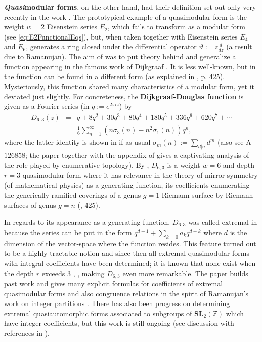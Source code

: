 \documentclass[11pt]{article}
\begin{document}
\textbf{\emph{Quasi}modular forms}, on the other hand, had their definition set out only very recently in the work \cite{kanekoZagier1995}. The prototypical example of a quasimodular form is the weight $ w = 2 $ Eisenstein series $ E_2 $, which fails to transform as a modular form (see \eqref{eq:E2FunctionalEqs}), but, when taken together with Eisenstein series $ E_4 $ and $ E_6 $, generates a ring closed under the differential operator $ \vartheta := z\frac{d}{dz} $ (a result due to Ramanujan). The aim of \cite{kanekoZagier1995} was to put theory behind and generalize a function appearing in the famous work of Dijkgraaf \cite{dijkgraaf1995}. It is less well-known, but in \cite{Douglas1995} the function can be found in a different form (as explained in \cite{LandoZvonkin2004}, p. 425). Mysteriously, this function shared many characteristics of a modular form, yet it deviated just slightly. For concreteness, the \textbf{Dijkgraaf-Douglas function} is given as a Fourier series (in $ q := e^{2 \pi i z} $) by
    \begin{eqnarray*}
        D_{6, 3}(z) &=& q + 8q^2 + 30q^3 + 80q^4 + 180q^5 +  336q^6 + 620q^7 + \cdots \\
        &=& \frac{1}{6} \sum_{n=1}^{\infty} (n\sigma_3(n) -n^2 \sigma_1(n))q^n,
    \end{eqnarray*}
where the latter identity is shown in \cite{kaminakaKato2021} if as usual $ \sigma_{m}(n) := \sum_{d|n} d^m $ (also see A$126858$; the paper \cite{mazur2004} together with the appendix of \cite{LandoZvonkin2004} gives a captivating analysis of the role played by enumerative topology). By \cite{kanekoZagier1995}, $ D_{6,3} $ is a weight $ w = 6 $ and depth $ r = 3 $ quasimodular form where it has relevance in the theory of mirror symmetry (of mathematical physics) as a generating function, its coefficients enumerating the generically ramified coverings of a genus $ g = 1 $ Riemann surface by Riemann surfaces of genus $ g = n  $ (\cite{LandoZvonkin2004}, 425). 

In regards to its appearance as a generating function, $ D_{6,3} $ was called extremal in \cite{kanekoKoike2006} because the series can be put in the form $ q^{d-1} + \sum_{k=0} a_k q^{d+k} $ where $ d $ is the dimension of the  vector-space where the function resides. This feature turned out to be a highly tractable notion and since then all extremal quasimodular forms with integral coefficients have been determined; it is known that none exist when the depth $ r $ exceeds $ 3 $ \cite{kaminakaKato2021}, \cite{nakaya2024}, making $ D_{6,3}$ even more remarkable. The paper \cite{nakaya2024} builds past work and gives many explicit formulas for coefficients of extremal quasimodular forms and also congruence relations in the spirit of Ramanujan's work on integer partitions \cite{Berndt2006}. There has also been progress on determining extremal quasiautomorphic forms associated to subgroups of $ \mathbf{SL}_2(\mathbb{Z}) $ which have integer coefficients, but this work is still ongoing (see discussion with references in \cite{nakaya2024}). 
\end{document}
